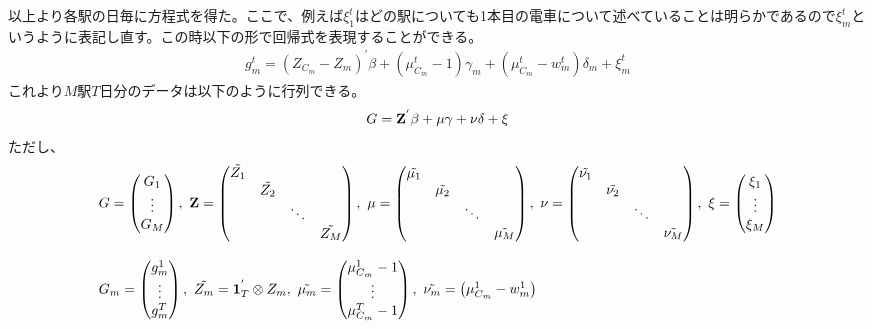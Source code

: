 \documentclass{jsarticle}
\begin{document}
以上より各駅の日毎に方程式を得た。ここで、例えば$\xi_1^t$はどの駅についても1本目の電車について述べていることは明らかであるので$\xi_m^t$というように表記し直す。この時以下の形で回帰式を表現することができる。
\begin{align*}
	g_m^t = (Z_{C_m} - Z_m)^{'} \beta + \left(\mu_{C_m}^t-1\right)\gamma_m + (\mu_{C_m}^t - w_m^t)\delta_m + \xi_m^t
\end{align*}
これより$M$駅$T$日分のデータは以下のように行列できる。
\begin{align*}
	G = {\bf Z}^{'}\beta + {\bf \mu} \gamma + {\bf \nu} \delta + \xi
\end{align*}
ただし、
\begin{align*}
	&G = \begin{pmatrix} G_1\\
	\vdots\\
	G_M\end{pmatrix},\ {\bf Z} = \begin{pmatrix} \tilde{Z_1}&&&\\
	&\tilde{Z_2}&&\\
	&&\ddots&\\
	&&&\tilde{Z_M}
	\end{pmatrix},\ {\bf \mu} =  \begin{pmatrix} \tilde{\mu_1}&&&\\
	&\tilde{\mu_2}&&\\
	&&\ddots&\\
	&&&\tilde{\mu_M}
	\end{pmatrix},\ {\bf \nu} =  \begin{pmatrix} \tilde{\nu_1}&&&\\
	&\tilde{\nu_2}&&\\
	&&\ddots&\\
	&&&\tilde{\nu_M}
	\end{pmatrix},\ \xi = \begin{pmatrix} \xi_1\\
	\vdots\\
	\xi_M \end{pmatrix}\\[8pt]
	&G_m = \begin{pmatrix} g_m^1\\
	\vdots\\
	g_m^T\end{pmatrix},\ \tilde{Z_m} = {\bf 1}_{T}^{'}\otimes Z_m,\ \tilde{\mu_m} = \begin{pmatrix} \mu_{C_m}^1 - 1\\
	\vdots\\
	\mu_{C_m}^T - 1\end{pmatrix},\ \tilde{\nu_m} = \begin{pmatrix} \mu_{C_m}^1 - w_m^1\\

\end{pmatrix}
\end{align*}
\end{document}
